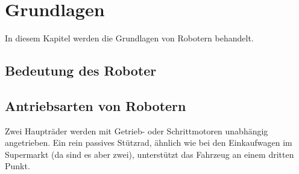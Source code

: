 \chapter{Grundlagen}
In diesem Kapitel werden die Grundlagen von Robotern behandelt.
\section{Bedeutung des Roboter}
\section{Antriebsarten von Robotern}
Zwei Haupträder werden mit Getrieb- oder Schrittmotoren unabhängig angetrieben. Ein rein passives Stützrad, ähnlich wie bei den Einkaufwagen im Supermarkt (da sind es aber zwei), unterstützt das Fahrzeug an einem dritten Punkt.
